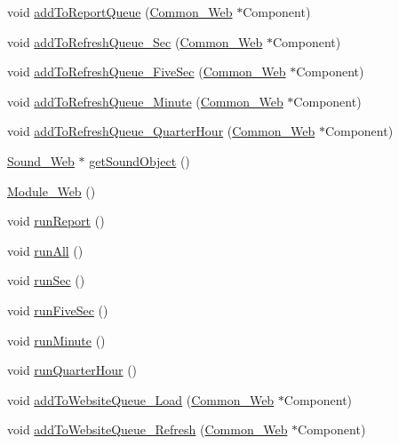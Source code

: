\begin{DoxyCompactItemize}
\item 
void \hyperlink{class_module___web_a9b1a806569076aa701e961d54f888447}{add\+To\+Report\+Queue} (\hyperlink{class_common___web}{Common\+\_\+\+Web} $\ast$Component)
\item 
void \hyperlink{class_module___web_a125e0abaefa5c6ab2379162a3ea9cf55}{add\+To\+Refresh\+Queue\+\_\+\+Sec} (\hyperlink{class_common___web}{Common\+\_\+\+Web} $\ast$Component)
\item 
void \hyperlink{class_module___web_a38624eecf0efaefb9210a60868327020}{add\+To\+Refresh\+Queue\+\_\+\+Five\+Sec} (\hyperlink{class_common___web}{Common\+\_\+\+Web} $\ast$Component)
\item 
void \hyperlink{class_module___web_ac449bdaf2aae62ba30ee63a58b1bdd5d}{add\+To\+Refresh\+Queue\+\_\+\+Minute} (\hyperlink{class_common___web}{Common\+\_\+\+Web} $\ast$Component)
\item 
void \hyperlink{class_module___web_ab6e5503496c826837eccf104c1fca09b}{add\+To\+Refresh\+Queue\+\_\+\+Quarter\+Hour} (\hyperlink{class_common___web}{Common\+\_\+\+Web} $\ast$Component)
\item 
\hyperlink{class_sound___web}{Sound\+\_\+\+Web} $\ast$ \hyperlink{class_module___web_a09662cbded5c21bb863ce53e082c2d79}{get\+Sound\+Object} ()
\item 
\hyperlink{class_module___web_ac0b37fdb18188955c71b17767cfe1b29}{Module\+\_\+\+Web} ()
\item 
void \hyperlink{class_module___web_a32622fc4e87a9885319c73c5b4802cc5}{run\+Report} ()
\item 
void \hyperlink{class_module___web_a1aa0d196cbc4ad14f561e1334a0ae98f}{run\+All} ()
\item 
void \hyperlink{class_module___web_adec2319a465bb9478e3699ce2d9612db}{run\+Sec} ()
\item 
void \hyperlink{class_module___web_a39cb72b8b1193e6a7d27d4ff414e07c6}{run\+Five\+Sec} ()
\item 
void \hyperlink{class_module___web_a580c12222077d148fe86cd0b07b263ec}{run\+Minute} ()
\item 
void \hyperlink{class_module___web_a89d99a5091a144203cc705deda0c0426}{run\+Quarter\+Hour} ()
\item 
void \hyperlink{class_module___web_a11f84c9609ed88d1bfcd869d64775e93}{add\+To\+Website\+Queue\+\_\+\+Load} (\hyperlink{class_common___web}{Common\+\_\+\+Web} $\ast$Component)
\item 
void \hyperlink{class_module___web_aee7880f65926af22ba1b83a73607e3b6}{add\+To\+Website\+Queue\+\_\+\+Refresh} (\hyperlink{class_common___web}{Common\+\_\+\+Web} $\ast$Component)

\end{DoxyCompactItemize}
